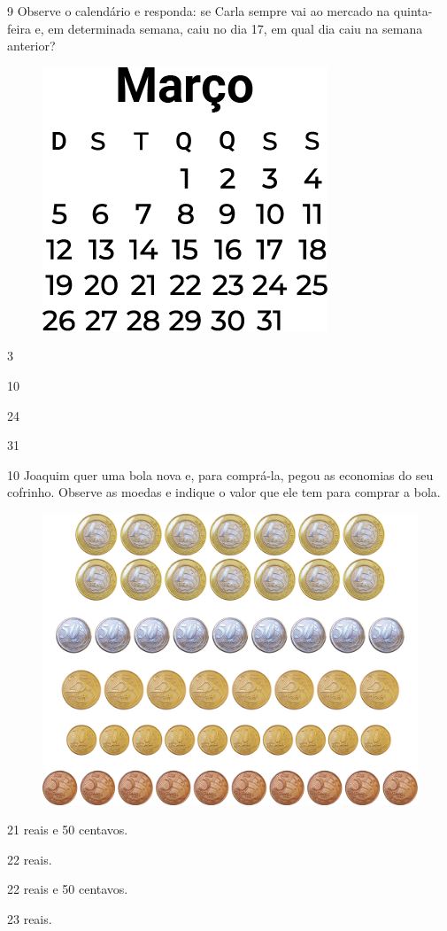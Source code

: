 \pagebreak
\num{9} Observe o calendário e responda: se Carla sempre vai ao mercado na
quinta-feira e, em determinada semana, caiu no dia 17, em qual dia caiu na semana anterior?

\begin{figure}[htpb!]
\centering
\includegraphics[width=.5\textwidth]{./media/image119.png}
\end{figure}

\begin{escolha}
\item 3

\item 10

\item 24

\item 31
\end{escolha}

\pagebreak
\num{10} Joaquim quer uma bola nova e, para comprá-la, pegou as economias do
seu cofrinho. Observe as moedas e indique o valor que ele tem para comprar a bola.

\begin{figure}[htpb!]
\centering
\includegraphics[width=.5\textwidth]{./media/image120.png}
\end{figure}

\begin{escolha}
\item 21 reais e 50 centavos.

\item 22 reais.

\item 22 reais e 50 centavos.

\item 23 reais.
\end{escolha}

